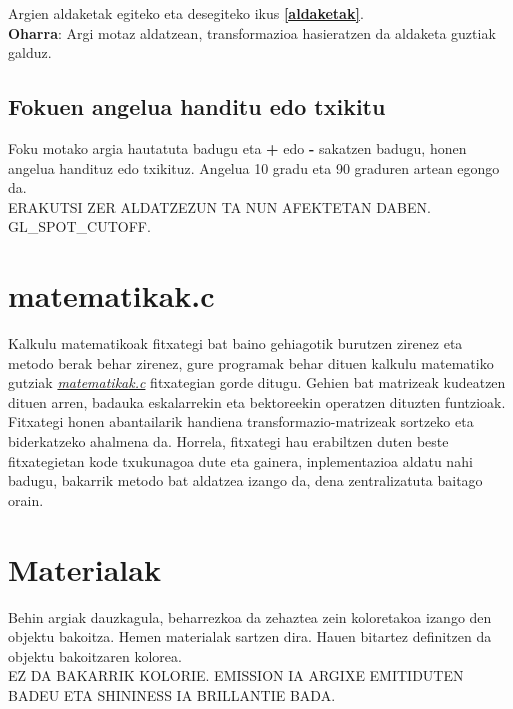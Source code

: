 \documentclass[12pt]{article}
\newcommand{\fitxategi}[1] {\underline{\textit{#1}}}
\newcommand{\tekla}[1] {\textbf{#1}}
\newcommand{\erref}[1] {\textbf{\ref{#1}}}
\begin{document}
Argien aldaketak egiteko eta desegiteko ikus \erref{aldaketak}.\\

\textbf{Oharra}: Argi motaz aldatzean, transformazioa hasieratzen da aldaketa guztiak galduz.

\subsection{Fokuen angelua handitu edo txikitu}

Foku motako argia hautatuta badugu eta \tekla{+} edo \tekla{-} sakatzen badugu, honen angelua handituz edo txikituz. Angelua 10 gradu eta 90 graduren artean egongo da.\\

ERAKUTSI ZER ALDATZEZUN TA NUN AFEKTETAN DABEN. GL\_SPOT\_CUTOFF.\\

\section{matematikak.c}\label{matematikak}

Kalkulu matematikoak fitxategi bat baino gehiagotik burutzen zirenez eta metodo berak behar zirenez, gure programak behar dituen kalkulu matematiko gutziak \fitxategi{matematikak.c} fitxategian gorde ditugu. Gehien bat matrizeak kudeatzen dituen arren, badauka eskalarrekin eta bektoreekin operatzen dituzten funtzioak.\\

Fitxategi honen abantailarik handiena transformazio-matrizeak sortzeko eta biderkatzeko ahalmena da. Horrela, fitxategi hau erabiltzen duten beste fitxategietan kode txukunagoa dute eta gainera, inplementazioa aldatu nahi badugu, bakarrik metodo bat aldatzea izango da, dena zentralizatuta baitago orain.\\

\section{Materialak}

Behin argiak dauzkagula, beharrezkoa da zehaztea zein koloretakoa izango den objektu bakoitza. Hemen materialak sartzen dira. Hauen bitartez definitzen da objektu bakoitzaren kolorea.\\

EZ DA BAKARRIK KOLORIE. EMISSION IA ARGIXE EMITIDUTEN BADEU ETA SHININESS IA  BRILLANTIE BADA.\\
\end{document}
